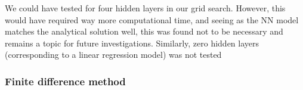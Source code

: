 We could have tested for four hidden layers in our grid search. 
However, this would have required way more computational time, and seeing as the NN model matches the analytical solution well, this was found not to be necessary and remains a topic for future investigations. 
Similarly, zero hidden layers (corresponding to a linear regression model) was not tested 

\subsubsection{Finite difference method}





